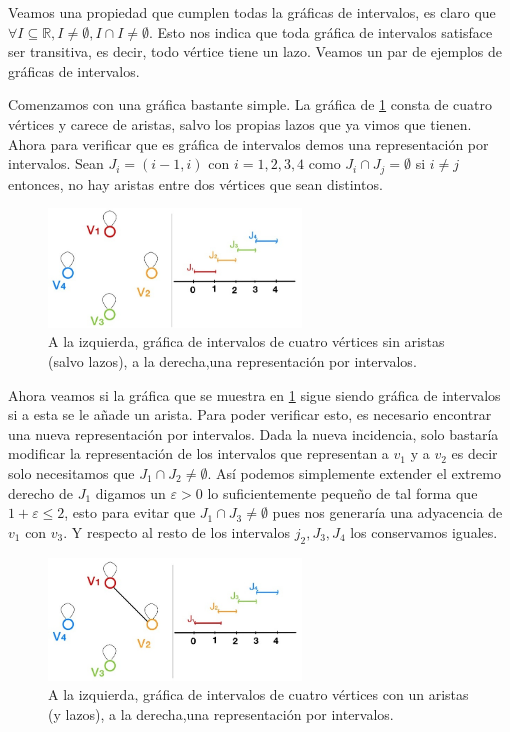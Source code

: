 Veamos una propiedad que cumplen todas la gráficas de intervalos, es claro que
$\forall I\subseteq \mathbb{R}, I\neq \emptyset, I\cap I \neq \emptyset$. Esto
nos indica que toda gráfica de intervalos satisface ser transitiva, es decir,
todo vértice tiene un lazo. Veamos un par de ejemplos de gráficas de intervalos.


Comenzamos con una gráfica bastante simple. La gráfica de \cref{fig:GrafInt01}
consta de cuatro vértices y carece de aristas, salvo los propias lazos que ya
vimos que tienen. Ahora para verificar que es gráfica de intervalos demos una
representación por intervalos. Sean $J_i = (i-1, i)$ con $i=1,2,3,4$ como $J_i
\cap J_j = \emptyset$ si $i\neq j$ entonces,  no hay aristas entre dos vértices
que sean distintos.    

\begin{figure}[H]
  \centering
  \includegraphics[width=0.6\textwidth]{recursos/capturas/201}
  \caption{A la izquierda, gráfica de intervalos de cuatro vértices sin aristas (salvo lazos), a la derecha,una representación por intervalos.}
  \label{fig:GrafInt01}
\end{figure}



    \label{exmpl:202}
    Ahora veamos si la gráfica que se muestra en \cref{fig:GrafInt01} sigue
    siendo gráfica de intervalos si a esta se le añade un arista. Para poder
    verificar esto, es necesario encontrar una nueva representación por
    intervalos. Dada la nueva incidencia, solo bastaría modificar la
    representación de los intervalos que representan a $v_1 $ y a $v_2$ es decir
    solo necesitamos que $J_1 \cap J_2 \neq \emptyset$. Así podemos simplemente
    extender el extremo derecho de $J_1$ digamos un $\varepsilon >0 $ lo
    suficientemente pequeño de tal forma que $1+\varepsilon \leq 2$, esto para
    evitar que $J_1 \cap J_3 \neq \emptyset$ pues nos generaría una adyacencia
    de $v_1 $ con $v_3$. Y respecto al resto de los intervalos $j_2, J_3, J_4$
    los conservamos iguales.    


\begin{figure}[H]
  \centering
  \includegraphics[width=0.6\textwidth]{recursos/capturas/202}
  \caption{A la izquierda, gráfica de intervalos de cuatro vértices con un aristas (y lazos), a la derecha,una representación por intervalos.}
  \label{fig:GrafInt02}
\end{figure}


